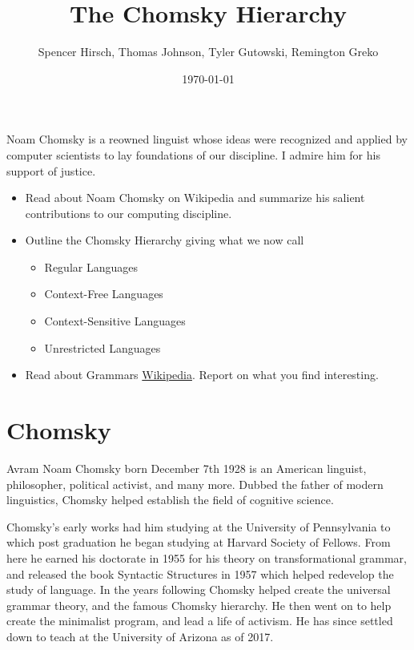 \documentclass{article}
\begin{document}
\title{The Chomsky Hierarchy}
\author{Spencer Hirsch, Thomas Johnson, Tyler Gutowski, Remington Greko}
\date{\today}

\maketitle

\noindent Noam Chomsky is a reowned linguist whose ideas were recognized and applied
by computer scientists to lay foundations of our discipline. I admire him 
for his support of justice.

\begin{itemize}
    \item Read about Noam Chomsky on Wikipedia and summarize his salient 
          contributions to our computing discipline.
    
    \item Outline the Chomsky Hierarchy giving what we now call
        \begin{itemize}
            \item Regular Languages
            \item Context-Free Languages
            \item Context-Sensitive Languages
            \item Unrestricted Languages
        \end{itemize}

    \item Read about Grammars \href{https://en.wikipedia.org/wiki/Grammar}{Wikipedia}. Report on what you find interesting.
\end{itemize}

\section{Chomsky}

\medskip

Avram Noam Chomsky born December 7th 1928 is an American linguist, philosopher, political activist, and many more. 
Dubbed the father of modern linguistics, Chomsky helped establish the field of cognitive science.
\medskip

Chomsky's early works had him studying at the University of Pennsylvania to which post graduation he began studying at Harvard Society of Fellows. 
From here he earned his doctorate in 1955 for his theory on transformational grammar, and  released the book Syntactic Structures in 1957 which helped redevelop the study of language. 
In the years following Chomsky helped create the universal grammar theory, and the famous Chomsky hierarchy. He then went on to help create the minimalist program, and lead a life of activism. 
He has since settled down to teach at the University of Arizona as of 2017.
\medskip
\end{document}
